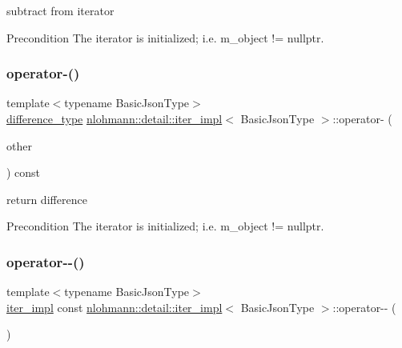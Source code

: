 subtract from iterator 

\begin{DoxyPrecond}{Precondition}
The iterator is initialized; i.\+e. {\ttfamily m\+\_\+object != nullptr}. 
\end{DoxyPrecond}
\mbox{\label{classnlohmann_1_1detail_1_1iter__impl_a49bf3e708a9c1c88c415011735962d06}} 
\subsubsection{\texorpdfstring{operator-\/()}{operator-()}\hspace{0.1cm}{\footnotesize\ttfamily [2/2]}}
{\footnotesize\ttfamily template$<$typename Basic\+Json\+Type$>$ \\
\hyperlink{classnlohmann_1_1detail_1_1iter__impl_a2f7ea9f7022850809c60fc3263775840}{difference\+\_\+type} \hyperlink{classnlohmann_1_1detail_1_1iter__impl}{nlohmann\+::detail\+::iter\+\_\+impl}$<$ Basic\+Json\+Type $>$\+::operator-\/ (\begin{DoxyParamCaption}\item[{const \hyperlink{classnlohmann_1_1detail_1_1iter__impl}{iter\+\_\+impl}$<$ Basic\+Json\+Type $>$ \&}]{other }\end{DoxyParamCaption}) const\hspace{0.3cm}{\ttfamily [inline]}}



return difference 

\begin{DoxyPrecond}{Precondition}
The iterator is initialized; i.\+e. {\ttfamily m\+\_\+object != nullptr}. 
\end{DoxyPrecond}
\mbox{\label{classnlohmann_1_1detail_1_1iter__impl_a1fc43e764467b8ea4a4cdd01f629d757}} 
\subsubsection{\texorpdfstring{operator-\/-\/()}{operator--()}\hspace{0.1cm}{\footnotesize\ttfamily [1/2]}}
{\footnotesize\ttfamily template$<$typename Basic\+Json\+Type$>$ \\
\hyperlink{classnlohmann_1_1detail_1_1iter__impl}{iter\+\_\+impl} const \hyperlink{classnlohmann_1_1detail_1_1iter__impl}{nlohmann\+::detail\+::iter\+\_\+impl}$<$ Basic\+Json\+Type $>$\+::operator-\/-\/ (\begin{DoxyParamCaption}\item[{int}]{ }\end{DoxyParamCaption})\hspace{0.3cm}{\ttfamily [inline]}}



